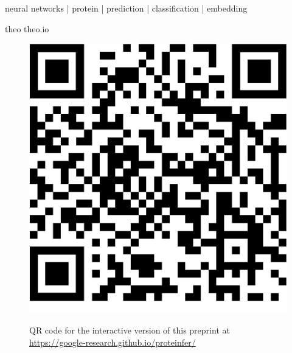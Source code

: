 \begin{keywords}
neural networks | protein | prediction | classification | embedding
\end{keywords}

\begin{corrauthor}
theo \at \;theo.io
\end{corrauthor}

\begin{figure}[h!]
  \centering
  \includegraphics[width=.4\columnwidth]{Figures/qr.pdf}

 \small QR code for the interactive version of this preprint at  \url{https://google-research.github.io/proteinfer/}
\end{figure}


